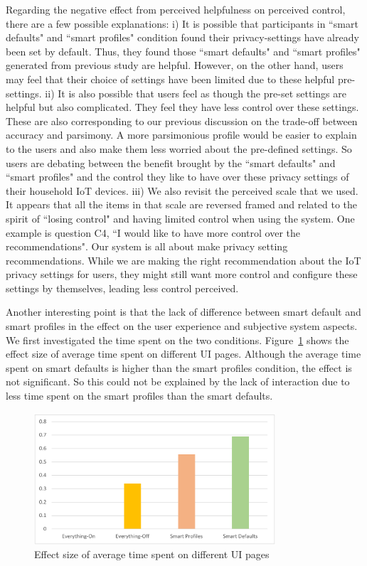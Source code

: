 Regarding the negative effect from perceived helpfulness on perceived control, there are a few possible explanations: i) It is possible that participants in ``smart defaults" and ``smart profiles" condition found their privacy-settings have already been set by default. Thus, they found those ``smart defaults" and ``smart profiles" generated from previous study are helpful. However, on the other hand, users may feel that their choice of settings have been limited due to these helpful pre-settings. ii) It is also possible that users feel as though the pre-set settings are helpful but also complicated. They feel they have less control over these settings. These are also corresponding to our previous discussion on the trade-off between accuracy and parsimony. A more parsimonious profile would be easier to explain to the users and also make them less worried about the pre-defined settings. So users are debating between the benefit brought by the ``smart defaults" and ``smart profiles" and the control they like to have over these privacy settings of their household IoT devices.
iii) We also revisit the perceived scale that we used. It appears that all the items in that scale are reversed framed and related to the spirit of ``losing control" and having limited control when using the system. One example is question C4, ``I would like to have more control over the recommendations". Our system is all about make privacy setting recommendations. While we are making the right recommendation about the IoT privacy settings for users, they might still want more control and configure these settings by themselves, leading less control perceived.

Another interesting point is that the lack of difference between smart default and smart profiles in the effect on the user experience and subjective system aspects. We first investigated the time spent on the two conditions. Figure~\ref{fig:timeonui} shows the effect size of average time spent on different UI pages. Although the average time spent on smart defaults is higher than the smart profiles condition, the effect is not significant. So this could not be explained by the lack of interaction due to less time spent on the smart profiles than the smart defaults.

\begin{figure}
	\centering
	\includegraphics[width=0.8\textwidth]{figures/timeonui.pdf}
	\caption{Effect size of average time spent on different UI pages}
	\label{fig:timeonui}
\end{figure}

